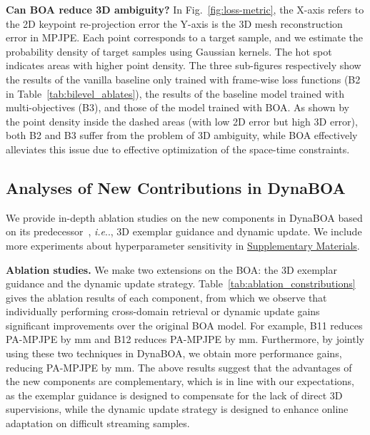 \documentclass[10pt,journal,compsoc]{IEEEtran}
\makeatletter
\DeclareRobustCommand\onedot{\futurelet\@let@token\@onedot}
\def\@onedot{\ifx\@let@token.\else.\null\fi\xspace}
\def\ie{\emph{i.e}\onedot} \def\Ie{\emph{I.e}\onedot}
\newcommand{\tab}[1]{Table~\ref{#1}}
\newcommand{\fig}[1]{Fig.~\ref{#1}}
\newcommand{\myparagraph}[1]{\vspace{5pt} \noindent \textbf{#1}}
\makeatother
\begin{document}
\myparagraph{Can BOA reduce 3D ambiguity?}
In \fig{fig:loss-metric}, the X-axis refers to the 2D keypoint re-projection error the Y-axis is the 3D mesh reconstruction error in MPJPE. Each point corresponds to a target sample, and we estimate the probability density of target samples using Gaussian kernels. 
The hot spot indicates areas with higher point density. 
The three sub-figures respectively show the results of the vanilla baseline only trained with frame-wise loss functions (B2 in \tab{tab:bilevel_ablates}), the results of the baseline model trained with multi-objectives ({B3}), and those of the model trained with BOA.
As shown by the point density inside the dashed areas (with low 2D error but high 3D error), both B2 and B3 suffer from the problem of 3D ambiguity, while BOA effectively alleviates this issue due to effective optimization of the space-time constraints. 








\subsection{Analyses of New Contributions in DynaBOA}

We provide in-depth ablation studies on the new components in DynaBOA based on its predecessor~\cite{guan2021bilevel}, \ie, 3D exemplar guidance and dynamic update. We include more experiments about hyperparameter sensitivity in \underline{Supplementary Materials}.


\myparagraph{Ablation studies.} 
We make two extensions on the BOA: the 3D exemplar guidance and the dynamic update strategy. \tab{tab:ablation_constributions} gives the ablation results of each component, from which we observe that individually performing cross-domain retrieval or dynamic update gains significant improvements over the original BOA model. 
For example, B11 reduces PA-MPJPE by mm and B12 reduces PA-MPJPE by mm.
Furthermore, by jointly using these two techniques in DynaBOA, we obtain more performance gains, reducing PA-MPJPE by mm. 
The above results suggest that the advantages of the new components are complementary, which is in line with our expectations, as the exemplar guidance is designed to compensate for the lack of direct 3D supervisions, while the dynamic update strategy is designed to enhance online adaptation on difficult streaming samples.
\end{document}
